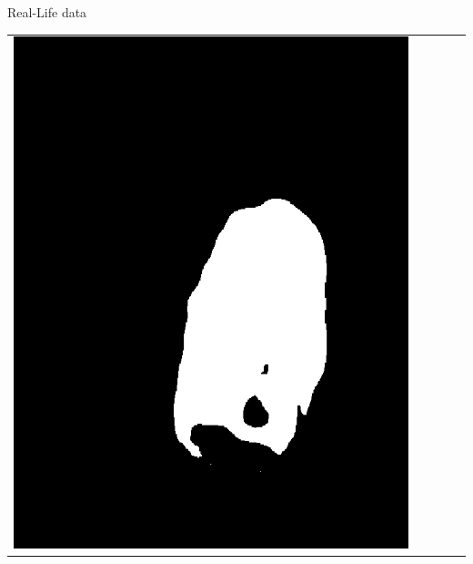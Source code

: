 \documentclass{beamer}
\begin{document}
\begin{frame}[c]{Real-Life data}
\begin{table}[h!]
\begin{tabular}{ | m{1.8cm} | m{1.8cm} | m{1.8cm}| m{1.8cm} | m{1.8cm} |}
\begin{minipage}{1.8cm}
				\includegraphics[width=\linewidth]{realLife/test0_mask_FCN_.png}
				\vspace{1pt}
			\end{minipage}
			& 
			\begin{minipage}{1.8cm}
				\centering
				\vspace{1pt}

\end{minipage}
\end{tabular}
\end{table}
\end{frame}
\end{document}
